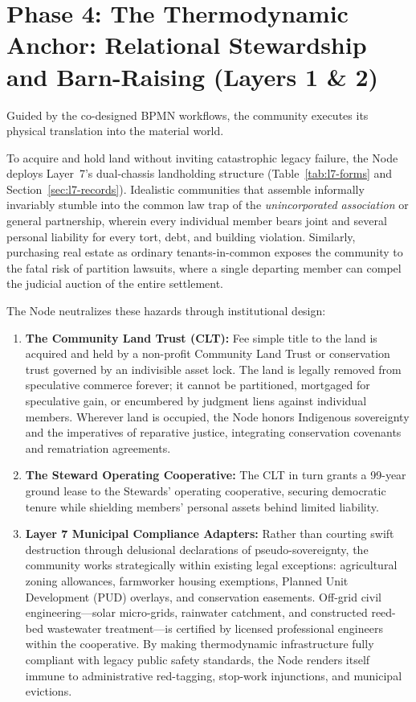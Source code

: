 \section[Phase 4: The Thermodynamic Anchor]{Phase 4: The Thermodynamic Anchor: Relational Stewardship and Barn-Raising (Layers 1 \& 2)}

Guided by the co-designed BPMN workflows, the community executes its physical translation into the material world. 

To acquire and hold land without inviting catastrophic legacy failure, the Node deploys Layer~7's dual-chassis landholding structure (Table~\ref{tab:l7-forms} and Section~\ref{sec:l7-records}). Idealistic communities that assemble informally invariably stumble into the common law trap of the \textit{unincorporated association} or general partnership, wherein every individual member bears joint and several personal liability for every tort, debt, and building violation. Similarly, purchasing real estate as ordinary tenants-in-common exposes the community to the fatal risk of partition lawsuits, where a single departing member can compel the judicial auction of the entire settlement.

The Node neutralizes these hazards through institutional design:
\begin{enumerate}
    \item \textbf{The Community Land Trust (CLT):} Fee simple title to the land is acquired and held by a non-profit Community Land Trust or conservation trust governed by an indivisible asset lock. The land is legally removed from speculative commerce forever; it cannot be partitioned, mortgaged for speculative gain, or encumbered by judgment liens against individual members. Wherever land is occupied, the Node honors Indigenous sovereignty and the imperatives of reparative justice, integrating conservation covenants and rematriation agreements.
    \item \textbf{The Steward Operating Cooperative:} The CLT in turn grants a 99-year ground lease to the Stewards' operating cooperative, securing democratic tenure while shielding members' personal assets behind limited liability.
    \item \textbf{Layer 7 Municipal Compliance Adapters:} Rather than courting swift destruction through delusional declarations of pseudo-sovereignty, the community works strategically within existing legal exceptions: agricultural zoning allowances, farmworker housing exemptions, Planned Unit Development (PUD) overlays, and conservation easements. Off-grid civil engineering---solar micro-grids, rainwater catchment, and constructed reed-bed wastewater treatment---is certified by licensed professional engineers within the cooperative. By making thermodynamic infrastructure fully compliant with legacy public safety standards, the Node renders itself immune to administrative red-tagging, stop-work injunctions, and municipal evictions.
\end{enumerate}

